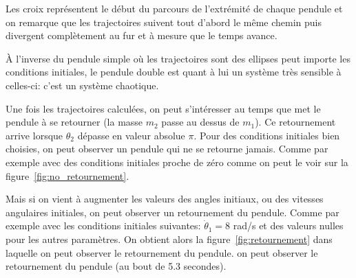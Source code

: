 \documentclass{article}
\begin{document}
Les croix représentent le début du parcours de l'extrémité de chaque pendule et on remarque que les trajectoires suivent tout d'abord le même chemin puis divergent complètement au fur et à mesure que le temps avance.

À l'inverse du pendule simple où les trajectoires sont des ellipses peut importe les conditions initiales, 
le pendule double est quant à lui un système très sensible à celles-ci: c'est un système chaotique.  

\bigskip

Une fois les trajectoires calculées, on peut s'intéresser au temps que met le pendule à se retourner (la masse $ m_{2} $ passe au
dessus de $ m_{1} $).
Ce retournement arrive lorsque $ \theta_{2} $ dépasse en valeur absolue $ \pi $.
Pour des conditions initiales bien choisies, on peut observer un pendule qui ne se retourne jamais. Comme par 
exemple avec des conditions initiales proche de zéro comme on peut le voir sur la figure~\ref{fig:no_retournement}. 

Mais si on vient à augmenter les valeurs des angles initiaux, ou 
des vitesses angulaires initiales, on peut observer un retournement du pendule. Comme par exemple avec les conditions initiales suivantes:
$ \dot \theta_{1} = 8 $ rad/s et des valeurs nulles pour les autres paramètres. On obtient alors la figure~\ref{fig:retournement} dans laquelle on peut observer le retournement du pendule.
on peut observer le retournement du pendule (au bout de 5.3 secondes).
\end{document}
